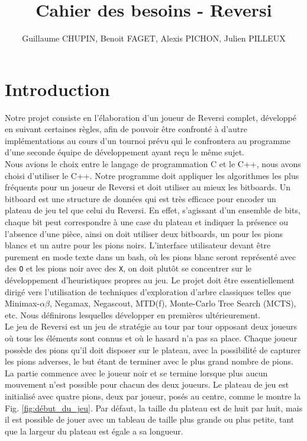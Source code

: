 \documentclass[10pt,a4paper]{article}
\title{Cahier des besoins - Reversi}
\author{Guillaume CHUPIN, Benoit FAGET, Alexis PICHON, Julien PILLEUX}
\begin{document}
\maketitle
\newpage
\tableofcontents
\newpage

\section{Introduction}

Notre projet consiste en l'élaboration d'un joueur de Reversi complet, développé en suivant certaines règles, afin de pouvoir être confronté à d'autre implémentations au cours d'un tournoi prévu qui le confrontera au programme d'une seconde équipe de développement ayant reçu le même sujet.\\

Nous avions le choix entre le langage de programmation C et le C++, nous avons choisi d'utiliser le C++. Notre programme doit appliquer les algorithmes les plus fréquents pour un joueur de Reversi et doit utiliser au mieux les bitboards. Un bitboard est une structure de données qui est très efficace pour encoder un plateau de jeu tel que celui du Reversi. En effet, s'agissant d'un ensemble de bits, chaque bit peut correspondre à une case du plateau et indiquer la présence ou l'absence d'une pièce, ainsi on doit utiliser deux bitboards, un pour les pions blancs et un autre pour les pions noirs. L'interface utilisateur devant être purement en mode texte dans un bash, où les pions blanc seront représenté avec des \verb!O! et les pions noir avec des \verb!X!, on doit plutôt se concentrer sur le développement d'heuristiques propres au jeu. Le projet doit être essentiellement dirigé vers l'utilisation de techniques d'exploration d'arbre classiques telles que Minimax-$\alpha\beta$, Negamax, Negascout, MTD(f), Monte-Carlo Tree Search (MCTS), etc. Nous définirons lesquelles développer en premières ultérieurement.\\

Le jeu de Reversi est un jeu de stratégie au tour par tour opposant deux joueurs où tous les éléments sont connus et où le hasard n'a pas sa place. Chaque joueur possède des pions qu'il doit disposer sur le plateau, avec la possibilité de capturer les pions adverses, le but étant de terminer avec le plus grand nombre de pions. La partie commence avec le joueur noir et se termine lorsque plus aucun mouvement n'est possible pour chacun des deux joueurs. Le plateau de jeu est initialisé avec quatre pions, deux par joueur, posés au centre, comme le montre la Fig. \ref{fig:début_du_jeu}. Par défaut, la taille du plateau est de huit par huit, mais il est possible de jouer avec un tableau de taille plus grande ou plus petite, tant que la largeur du plateau est égale a sa longueur.
\end{document}
